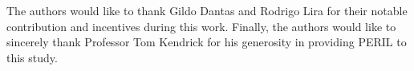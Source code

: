 \documentclass[a4paper,twoside]{article}
\begin{document}
\noindent The authors would like to thank Gildo Dantas and Rodrigo Lira for their notable contribution and incentives during this work. Finally, the authors would like to sincerely thank Professor Tom Kendrick for his generosity in providing PERIL to this study.


{\small
}

\vfill
\end{document}
